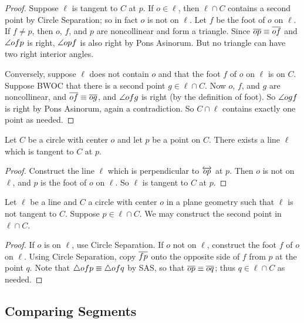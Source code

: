 \begin{proof}
Suppose $\ell$ is tangent to $C$ at $p$. If $o \in \ell$, then $\ell \cap C$ contains a second point by Circle Separation; so in fact $o$ is not on $\ell$. Let $f$ be the foot of $o$ on $\ell$. If $f \neq p$, then $o$, $f$, and $p$ are noncollinear and form a triangle. Since $\overline{op} \equiv \overline{of}$ and $\angle{ofp}$ is right, $\angle{opf}$ is also right by Pons Asinorum. But no triangle can have two right interior angles.

Conversely, suppose $\ell$ does not contain $o$ and that the foot $f$ of $o$ on $\ell$ is on $C$. Suppose BWOC that there is a second point $g \in \ell \cap C$. Now $o$, $f$, and $g$ are noncollinear, and $\overline{of} \equiv \overline{og}$, and $\angle{ofg}$ is right (by the definition of foot). So $\angle{ogf}$ is right by Pons Asinorum, again a contradiction. So $C \cap \ell$ contains exactly one point as needed. 
\end{proof}

\begin{construct}
Let $C$ be a circle with center $o$ and let $p$ be a point on $C$. There exists a line $\ell$ which is tangent to $C$ at $p$.
\end{construct}

\begin{proof}
Construct the line $\ell$ which is perpendicular to $\overleftrightarrow{op}$ at $p$. Then $o$ is not on $\ell$, and $p$ is the foot of $o$ on $\ell$. So $\ell$ is tangent to $C$ at $p$.
\end{proof}

\begin{construct}
Let $\ell$ be a line and $C$ a circle with center $o$ in a plane geometry such that $\ell$ is not tangent to $C$. Suppose $p \in \ell \cap C$. We may construct the second point in $\ell \cap C$.
\end{construct}

\begin{proof}
If $o$ is on $\ell$, use Circle Separation. If $o$ not on $\ell$, construct the foot $f$ of $o$ on $\ell$. Using Circle Separation, copy $\overline{fp}$ onto the opposite side of $f$ from $p$ at the point $q$. Note that $\bigtriangleup{ofp} \equiv \bigtriangleup{ofq}$ by SAS, so that $\overline{op} \equiv \overline{oq}$; thus $q \in \ell \cap C$ as needed.
\end{proof}

\subsection*{Comparing Segments}

